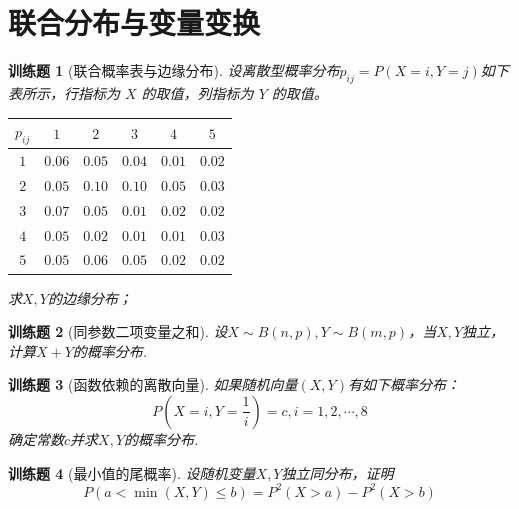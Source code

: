\documentclass[UTF8,12pt,a4paper,fontset=fandol]{ctexbook}
\newtheorem{exercise}{训练题}[section]
\begin{document}
\clearpage\section{联合分布与变量变换}

\begin{exercise}[联合概率表与边缘分布]\label{q:Y4.3}
设离散型概率分布$p_{ij}=P(X=i,Y=j)$如下表所示，行指标为 $X$ 的取值，列指标为 $Y$ 的取值。

\begin{center}
    
    \begin{tabular}{|c|c|c|c|c|c|} \hline 
 $p_{ij}$&  $1$&$2$&$3$&$4$&$5$\\ \hline 
 $1$&  $0.06$&$0.05$    &$0.04$&$0.01$&$0.02$\\ \hline 
         $2$&    $0.05$&$0.10$&$0.10$&$0.05$&$0.03$\\ \hline 
         $3$& 
      $0.07$&$0.05$& $0.01$&$0.02$&$0.02$\\ \hline
 $4$& $0.05$& $0.02$& $0.01$&$0.01$&$0.03$\\\hline
 $5$& $0.05$& $0.06$& $0.05$& $0.02$&$0.02$\\\hline\end{tabular}
\end{center}

求$X,Y$的边缘分布；\par{}\end{exercise}

\begin{exercise}[同参数二项变量之和]\label{q:Y4.6}
设$X\sim B(n,p),Y\sim B(m,p)$，当$X,Y$独立，计算$X+Y$的概率分布.\par{}\end{exercise}

\begin{exercise}[函数依赖的离散向量]\label{q:Y4.8}
如果随机向量$(X,Y)$有如下概率分布：
\[
P(X=i,Y=\frac{1}{i})=c,i=1,2,\cdots,8
\]
确定常数$c$并求$X,Y$的概率分布.\par{}\end{exercise}

\begin{exercise}[最小值的尾概率]\label{q:Y4.9}
设随机变量$X,Y$独立同分布，证明
\[
P(a<\min (X,Y)\leqslant b)=P^2(X>a)-P^2(X>b)
\]\par{}\end{exercise}
\end{document}
